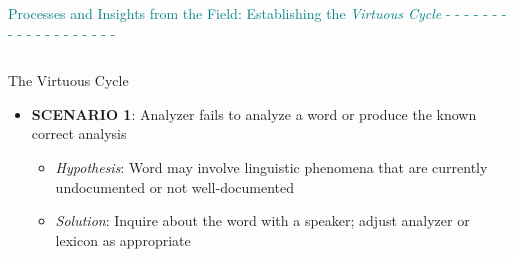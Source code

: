 \documentclass[usenames,dvipsnames]{beamer}
\begin{document}
\begin{frame}[fragile]

\vspace{28pt}




{\LARGE \textcolor{orange}{\textbf{\PencilLeftDown}} \textcolor{teal}{Processes and Insights from the Field: Establishing the \textit{Virtuous Cycle} - - - - - - - - - - - - - - - - - - -}}

\vspace{28pt}

\begin{columns}

\begin{column}{0.3\textwidth}
\begin{block}{The Virtuous Cycle}
\vspace*{8mm}
\begin{itemize}
\setlength\itemsep{48pt}
    \item \textbf{SCENARIO 1}: Analyzer fails to analyze a word or produce the known correct analysis
    \vspace{24pt}
    \begin{itemize}
    \setlength\itemsep{24pt}
    \item \textit{Hypothesis}: Word may involve linguistic phenomena that are currently undocumented or not well-documented
            
    \item \textit{Solution}: Inquire about the word with a speaker; %
    adjust analyzer or lexicon as appropriate
   


\end{itemize}
\end{itemize}
\end{block}
\end{column}
\end{columns}
\end{frame}
\end{document}

